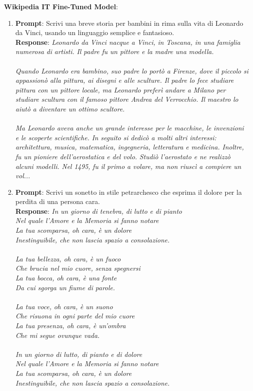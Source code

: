 \documentclass{article}
\begin{document}
	\textbf{Wikipedia IT Fine-Tuned Model}:
	\begin{enumerate}

		\item 
		\textbf{Prompt}: Scrivi una breve storia per bambini in rima sulla vita di Leonardo da Vinci, usando un linguaggio semplice e fantasioso.\\
		\textbf{Response}: \textit{Leonardo da Vinci nacque a Vinci, in Toscana, in una famiglia numerosa di artisti. Il padre fu un pittore e la madre una modella.\\\\Quando Leonardo era bambino, suo padre lo portò a Firenze, dove il piccolo si appassionò alla pittura, ai disegni e alle sculture. Il padre lo fece studiare pittura con un pittore locale, ma Leonardo preferì andare a Milano per studiare scultura con il famoso pittore Andrea del Verrocchio. Il maestro lo aiutò a diventare un ottimo scultore.\\\\Ma Leonardo aveva anche un grande interesse per le macchine, le invenzioni e le scoperte scientifiche. In seguito si dedicò a molti altri interessi: architettura, musica, matematica, ingegneria, letteratura e medicina. Inoltre, fu un pioniere dell'aerostatica e del volo. Studiò l'aerostato e ne realizzò alcuni modelli. Nel 1495, fu il primo a volare, ma non riuscì a compiere un vol...}
		
		\item 
		\textbf{Prompt}: Scrivi un sonetto in stile petrarchesco che esprima il dolore per la perdita di una persona cara.\\
		\textbf{Response}: \textit{In un giorno di tenebra, di lutto e di pianto\\Nel quale l'Amore e la Memoria si fanno notare\\La tua scomparsa, oh cara, è un dolore\\Inestinguibile, che non lascia spazio a consolazione.\\\\La tua bellezza, oh cara, è un fuoco\\Che brucia nel mio cuore, senza spegnersi\\La tua bocca, oh cara, è una fonte\\Da cui sgorga un fiume di parole.\\\\La tua voce, oh cara, è un suono\\Che risuona in ogni parte del mio cuore\\La tua presenza, oh cara, è un'ombra\\Che mi segue ovunque vada.\\\\In un giorno di lutto, di pianto e di dolore\\Nel quale l'Amore e la Memoria si fanno notare\\La tua scomparsa, oh cara, è un dolore\\Inestinguibile, che non lascia spazio a consolazione.}
		

\end{enumerate}
\end{document}
